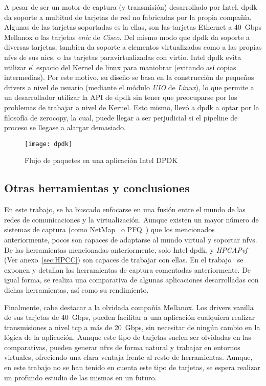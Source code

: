 A pesar de ser un motor de captura (y transmisión) desarrollado por Intel, \gls{dpdk} da soporte a multitud de tarjetas de red no fabricadas por la propia compañía. Algunas de las tarjetas soportadas es la ellas, son las tarjetas Ethernet a 40~Gbps Mellanox o las tarjetas \textit{enic} de \textit{Cisco}. Del mismo modo que \gls{dpdk} da soporte a diversas tarjetas, tambien da soporte a elementos virtualizados como a las propias \glspl{nfv} de sus \glspl{nic}, o las tarjetas paravirtualizadas con \gls{virtio}.
Intel \gls{dpdk} evita utilizar el espacio del Kernel de linux para maniobrar (evitando así copias intermedias). Por este motivo, su diseño se basa en la construcción de pequeños drivers a nivel de usuario (mediante el módulo \textit{UIO} de \textit{Linux}), lo que permite a un desarrollador utilizar la API de \gls{dpdk} sin tener que preocuparse por los problemas de trabajar a nivel de Kernel.
Esto mismo, llevó a \gls{dpdk} a optar por la filosofía de \gls{zerocopy}, la cual, puede llegar a ser perjudicial si el pipeline de proceso se llegase a alargar demasiado.


\begin{figure}[!bth]
\centering
\texttt{[image: dpdk]}
\caption{Flujo de paquetes en una aplicación Intel DPDK}
\label{fig:flow:dpdk}
\end{figure}


\subsection{Otras herramientas y conclusiones}

En este trabajo, se ha buscado enfocarse en una fusión entre el mundo de las redes de comunicaciones y la virtualización. Aunque existen un mayor número de sistemas de captura (como NetMap~\cite{rizzo12usenix,rizzo12cacm,rizzoNETWORK14} o PFQ~\cite{bonelli12pam}) que los mencionados anteriormente, pocos son capaces de adaptarse al mundo virtual y soportar \glspl{nfv}. De las herramientas mencionadas anteriormente, solo Intel \gls{dpdk}, y \textit{HPCAPvf} (Ver anexo~\ref{sec:HPCC}) son capaces de trabajar con ellas.
En el trabajo~\cite{7101227} se exponen y detallan las herramientas de captura comentadas anteriormente. De igual forma, se realiza una comparativa de algunas aplicaciones desarrolladas con dichas herramientas, así como su rendimiento.

Finalmente, cabe destacar a la olvidada compañía Mellanox. Los drivers \gls{vanilla} de sus tarjetas de 40~Gbps, pueden facilitar a una aplicación cualquiera realizar transmisiones a nivel tcp a más de 20~Gbps, sin necesitar de ningún cambio en la lógica de la aplicación. Aunque este tipo de tarjetas suelen ser olvidadas en las comparativas, pueden generar \glspl{nfv} de forma natural y trabajar en entornos virtuales, ofreciendo una clara ventaja frente al resto de herramientas. Aunque, en este trabajo no se han tenido en cuenta este tipo de tarjetas, se espera realizar un profundo estudio de las mismas en un futuro.

